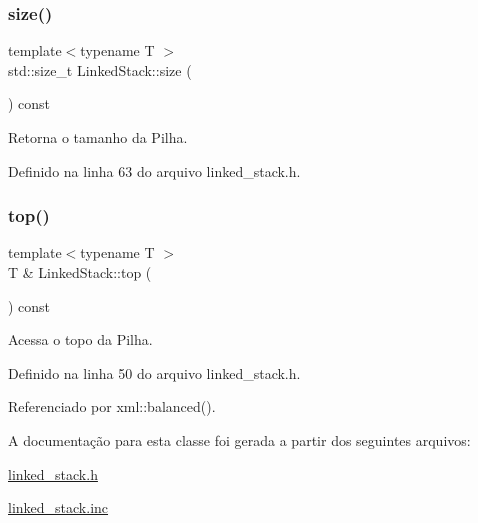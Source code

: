 \subsubsection{\texorpdfstring{size()}{size()}}
{\footnotesize\ttfamily template$<$typename T $>$ \\
std\+::size\+\_\+t Linked\+Stack\+::size (\begin{DoxyParamCaption}{ }\end{DoxyParamCaption}) const}



Retorna o tamanho da Pilha. 



Definido na linha 63 do arquivo linked\+\_\+stack.\+h.

\mbox{\label{classstructures_1_1_linked_stack_ac1405eff07488586dced5275b97e562f}} 
\subsubsection{\texorpdfstring{top()}{top()}}
{\footnotesize\ttfamily template$<$typename T $>$ \\
T \& Linked\+Stack\+::top (\begin{DoxyParamCaption}{ }\end{DoxyParamCaption}) const}



Acessa o topo da Pilha. 



Definido na linha 50 do arquivo linked\+\_\+stack.\+h.



Referenciado por xml\+::balanced().



A documentação para esta classe foi gerada a partir dos seguintes arquivos\+:\begin{DoxyCompactItemize}
\item 
\mbox{\hyperlink{linked__stack_8h}{linked\+\_\+stack.\+h}}\item 
\mbox{\hyperlink{linked__stack_8inc}{linked\+\_\+stack.\+inc}}\end{DoxyCompactItemize}
